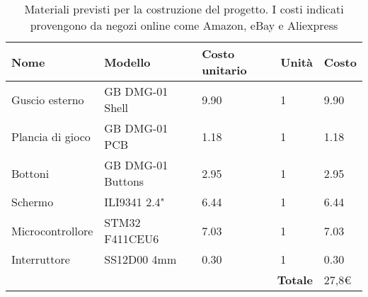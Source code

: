 \documentclass[12pt]{article}
\begin{document}
\begin{center}
\begin{table}[h]
    \centering
    \begin{tabular}{|llll|l|}
        \hline
        \multicolumn{1}{|l|}{\textbf{Nome}}    & \multicolumn{1}{l|}{\textbf{Modello}}  & \multicolumn{1}{l|}{\textbf{Costo unitario}} & \textbf{Unità} & \textbf{Costo} \\ \hline
        \multicolumn{1}{|l|}{Guscio esterno}   & \multicolumn{1}{l|}{GB DMG-01 Shell}   & \multicolumn{1}{l|}{9.90}                     & 1              & 9.90          \\ \hline
        \multicolumn{1}{|l|}{Plancia di gioco} & \multicolumn{1}{l|}{GB DMG-01 PCB}     & \multicolumn{1}{l|}{1.18}                     & 1              & 1.18          \\ \hline
        \multicolumn{1}{|l|}{Bottoni}          & \multicolumn{1}{l|}{GB DMG-01 Buttons} & \multicolumn{1}{l|}{2.95}                     & 1              & 2.95          \\ \hline
        \multicolumn{1}{|l|}{Schermo}          & \multicolumn{1}{l|}{ILI9341 2.4"}      & \multicolumn{1}{l|}{6.44}                     & 1              & 6.44          \\ \hline
        \multicolumn{1}{|l|}{Microcontrollore} & \multicolumn{1}{l|}{STM32 F411CEU6}    & \multicolumn{1}{l|}{7.03}                     & 1              & 7.03          \\ \hline
        \multicolumn{1}{|l|}{Interruttore}     & \multicolumn{1}{l|}{SS12D00 4mm}       & \multicolumn{1}{l|}{0.30}                     & 1              & 0.30          \\ \hline
        \multicolumn{4}{|r|}{\textbf{Totale}}                                                                                                            & 27,8€         \\ \hline
    \end{tabular}
    \caption{
        Materiali previsti per la costruzione del progetto. I costi indicati
        provengono da negozi online come Amazon, eBay e Aliexpress
    }
\end{table}
\end{center}
\end{document}
